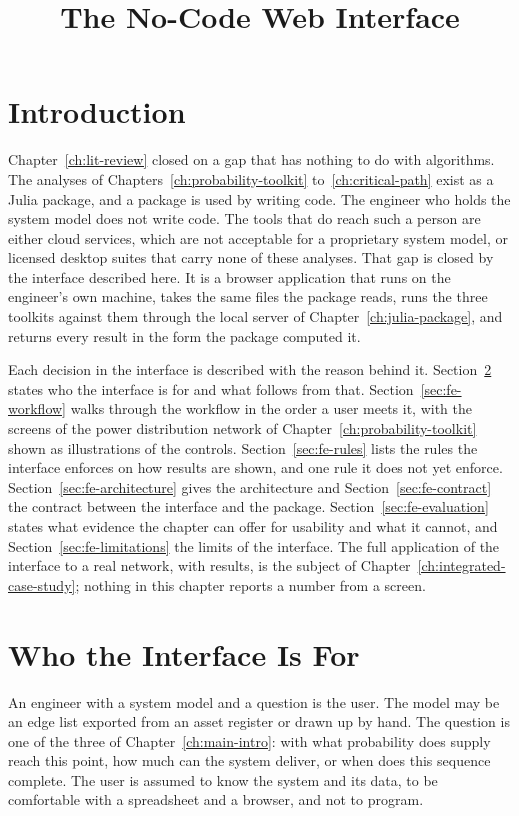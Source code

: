 \documentclass[12pt]{report}
\begin{document}
\title{The No-Code Web Interface}
\fi

\section{Introduction}
\label{sec:fe-intro}

Chapter~\ref{ch:lit-review} closed on a gap that has nothing to do with algorithms. The
analyses of Chapters~\ref{ch:probability-toolkit} to~\ref{ch:critical-path} exist as a Julia
package, and a package is used by writing code. The engineer who holds the system model
does not write code. The tools that do reach such a person are either cloud
services, which are not acceptable for a proprietary system model, or licensed desktop
suites that carry none of these analyses.
That gap is closed by the interface described here. It is a browser application that
runs on the engineer's own machine, takes the same files the package reads, runs the three
toolkits against them through the local server of Chapter~\ref{ch:julia-package}, and
returns every result in the form the package computed it.

Each decision in the interface is described with the reason behind it.
Section~\ref{sec:fe-user} states who the interface is for and what follows from that.
Section~\ref{sec:fe-workflow} walks through the workflow in the order a user meets it, with
the screens of the power distribution network of Chapter~\ref{ch:probability-toolkit}
shown as illustrations of the controls. Section~\ref{sec:fe-rules} lists the rules the
interface enforces on how results are shown, and one rule it does not yet enforce.
Section~\ref{sec:fe-architecture} gives the architecture and Section~\ref{sec:fe-contract}
the contract between the interface and the package. Section~\ref{sec:fe-evaluation} states
what evidence the chapter can offer for usability and what it cannot, and
Section~\ref{sec:fe-limitations} the limits of the interface. The full application of the
interface to a real network, with results, is the subject of
Chapter~\ref{ch:integrated-case-study}; nothing in this chapter reports a number from a
screen.

\section{Who the Interface Is For}
\label{sec:fe-user}

An engineer with a system model and a question is the user. The model may be an edge list exported from an asset register or drawn up by hand. The
question is one of the three of Chapter~\ref{ch:main-intro}: with what probability does
supply reach this point, how much can the system deliver, or when does this sequence
complete. The user is assumed to know
the system and its data, to be comfortable with a spreadsheet and a browser, and not to
program.
\end{document}
